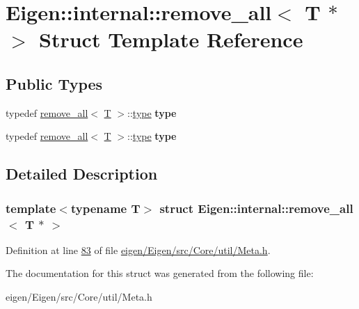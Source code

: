 \hypertarget{struct_eigen_1_1internal_1_1remove__all_3_01_t_01_5_01_4}{}\section{Eigen\+:\+:internal\+:\+:remove\+\_\+all$<$ T $\ast$ $>$ Struct Template Reference}
\label{struct_eigen_1_1internal_1_1remove__all_3_01_t_01_5_01_4}
\subsection*{Public Types}
\begin{DoxyCompactItemize}
\item 
\mbox{\label{struct_eigen_1_1internal_1_1remove__all_3_01_t_01_5_01_4_a5ea5cc87f92e865762fbffc491e8bac9}} 
typedef \hyperlink{struct_eigen_1_1internal_1_1remove__all}{remove\+\_\+all}$<$ \hyperlink{group___sparse_core___module}{T} $>$\+::\hyperlink{group___sparse_core___module}{type} {\bfseries type}
\item 
\mbox{\label{struct_eigen_1_1internal_1_1remove__all_3_01_t_01_5_01_4_a5ea5cc87f92e865762fbffc491e8bac9}} 
typedef \hyperlink{struct_eigen_1_1internal_1_1remove__all}{remove\+\_\+all}$<$ \hyperlink{group___sparse_core___module}{T} $>$\+::\hyperlink{group___sparse_core___module}{type} {\bfseries type}
\end{DoxyCompactItemize}


\subsection{Detailed Description}
\subsubsection*{template$<$typename T$>$\newline
struct Eigen\+::internal\+::remove\+\_\+all$<$ T $\ast$ $>$}



Definition at line \hyperlink{eigen_2_eigen_2src_2_core_2util_2_meta_8h_source_l00083}{83} of file \hyperlink{eigen_2_eigen_2src_2_core_2util_2_meta_8h_source}{eigen/\+Eigen/src/\+Core/util/\+Meta.\+h}.



The documentation for this struct was generated from the following file\+:\begin{DoxyCompactItemize}
\item 
eigen/\+Eigen/src/\+Core/util/\+Meta.\+h\end{DoxyCompactItemize}
